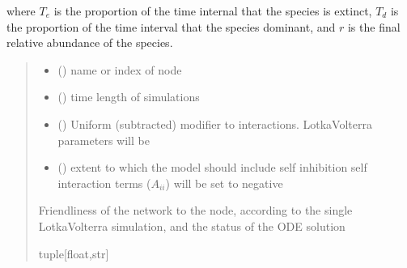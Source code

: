 \documentclass[letterpaper,10pt,english]{sphinxmanual}
\begin{document}
\begin{fulllineitems}
\begin{fulllineitems}
\sphinxAtStartPar
where \(T_e\) is the proportion of the time internal that the species is  extinct, \(T_d\) is the proportion of the time interval that the species  dominant, and \(r\) is the final relative abundance of the species.
\begin{quote}\begin{description}
\begin{itemize}
\item {} 
\sphinxAtStartPar
{} () \textendash{} name or index of node

\item {} 
\sphinxAtStartPar
{} () \textendash{} time length of simulations

\item {} 
\sphinxAtStartPar
{} () \textendash{} Uniform (subtracted) modifier to interactions. Lotka\sphinxhyphen{}Volterra parameters will be {\hyperref[\detokenize{friendlynets:friendlyNet.friendlyNet.Adjacency}]{}} \sphinxhyphen{} 

\item {} 
\sphinxAtStartPar
{} () \textendash{} extent to which the model should include self inhibition \sphinxhyphen{} self interaction terms (\(A_{ii}\)) will be set to negative 

\end{itemize}

\sphinxAtStartPar
Friendliness of the network to the node, according to the single Lotka\sphinxhyphen{}Volterra simulation, and the status of the ODE solution

\sphinxAtStartPar
tuple{[}float,str{]}

\end{description}\end{quote}

\end{fulllineitems}


\end{fulllineitems}
\end{document}
